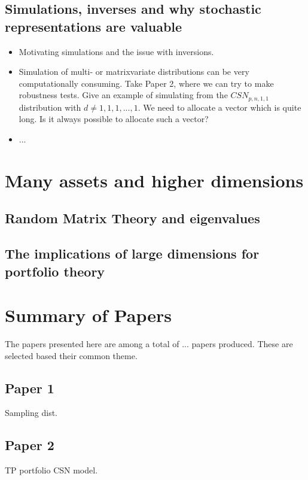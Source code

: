 \documentclass[]{book}
\begin{document}
\section{Simulations, inverses and why stochastic representations are valuable}
\begin{itemize}
	\item Motivating simulations and the issue with inversions.
	\item Simulation of multi- or matrixvariate distributions can be very computationally consuming. Take Paper 2, where we can try to make robustness tests. Give an example of simulating from the $CSN_{p,n,1,1}$ distribution with $d\neq 1,1,1,...,1$. We need to allocate a vector which is quite long. Is it always possible to allocate such a vector?
	\item ...
\end{itemize}
\chapter{Many assets and higher dimensions}
\section{Random Matrix Theory and eigenvalues}

\section{The implications of large dimensions for portfolio theory}

\chapter{Summary of Papers}
The papers presented here are among a total of ... papers produced. These are selected based their common theme.
\section*{Paper 1}
Sampling dist.
\section*{Paper 2}
TP portfolio CSN model.
\end{document}
